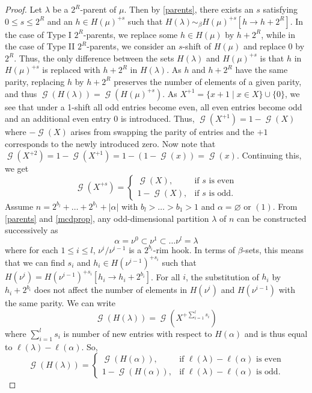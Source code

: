 \documentclass[12pt]{amsart}
\theoremstyle{definition}
\numberwithin{equation}{section}
\newcommand{\la}{\lambda}
\DeclareMathOperator{\g}{\mathcal{G}}
\begin{document}
\begin{proof}
Let $\la$ be a $2^R$-parent of $\mu$. Then by \cref{parents}, there exists an $s$ satisfying $0\leq s\leq 2^R$ and an $h\in H(\mu)^{+s}$ such that $H(\lambda) \sim_\beta H(\mu)^{+s}[h\to h+2^R]$. In the case of Type I $2^R$-parents, we replace some $h\in H(\mu)$ by $h+2^R$, while in the case of Type II $2^R$-parents, we consider an $s$-shift of $H(\mu)$ and replace 0 by $2^R$. Thus, the only difference between the sets $H(\la)$ and $H(\mu)^{+s}$ is that $h$ in $H(\mu)^{+s}$ is replaced with $h+2^R$ in $H(\la)$. As $h$ and $h+2^R$ have the same parity, replacing $h$ by $h+2^R$ preserves the number of elements of a given parity, and thus $\g(H(\lambda)) = \g(H(\mu)^{+s})$.
As $X^{+1} = \{x+1\mid x\in X\}\cup\{0\}$, we see that under a 1-shift all odd entries become even, all even entries become odd and an additional even entry $0$ is introduced. Thus, $\g(X^{+1}) = 1 - \g(X)$ where $- \g(X)$ arises from swapping the parity of entries and the $+1$ corresponds to the newly introduced zero. Now note that $\g(X^{+2}) = 1-\g(X^{+1})= 1- (1-\g(x)) = \g(x)$. Continuing this, we get
\[
\g(X^{+s}) = 
\begin{cases}
\g(X), &\text{if } s \text{ is even}\\
1-\g(X),&\text{if }s \text{ is odd.}
\end{cases}
\]
Assume $n = 2^{b_l} + \ldots + 2^{b_1} + |\alpha|$ with $b_l > \ldots > b_1>1$ and $\alpha = \varnothing$ or $(1)$.
From \cref{parents} and \cref{mcdprop}, any odd-dimensional partition $\lambda$ of $n$ can be constructed successively as
\[
\alpha =\nu^0 \subset \nu^{1} \subset \ldots \nu^{l}=\lambda
\]
where for each $1\leq i \leq l$, $\nu^i/\nu^{i-1}$ is a $2^{b_i}$-rim hook. In terms of $\beta$-sets, this means that we can find $s_i$ and $h_i\in H(\nu^{i-1})^{+s_i}$ such that $H(\nu^i) = H(\nu^{i-1})^{+s_i}[h_i \to h_i+2^{b_i}]$. For all $i$, the substitution of $h_i$ by $ h_i+2^{b_i}$ does not affect the number of elements in $H(\nu^i)$ and $H(\nu^{i-1})$ with the same parity. We can write 
\[
\g(H(\lambda)) = \g(X^{+\sum\limits_{i=1}^l s_i})
\]
where $\sum\limits_{i=1}^l s_i$ is number of new entries with respect to $H(\alpha)$ and is thus equal to $\ell(\lambda) -\ell(\alpha)$. So, 
\[\g(H(\lambda)) = 
\begin{cases}
\g(H(\alpha)), & \text{if }\ell(\lambda) -\ell(\alpha)\text{ is even}\\
1 -\g(H(\alpha)),&\text{if }\ell(\lambda) -\ell(\alpha)\text{ is odd.}
\end{cases}
\]

\end{proof}
\end{document}
